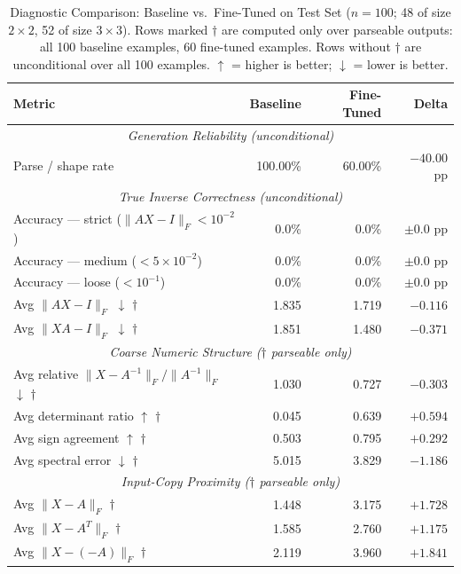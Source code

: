 \begin{table}[h!]
\centering
\caption{Diagnostic Comparison: Baseline vs.\ Fine-Tuned on Test Set ($n = 100$; 48 of size $2 \times 2$, 52 of size $3 \times 3$). Rows marked $\dagger$ are computed only over parseable outputs: all 100 baseline examples, 60 fine-tuned examples. Rows without $\dagger$ are unconditional over all 100 examples. $\uparrow$ = higher is better; $\downarrow$ = lower is better.}
\label{tab:results}
\begin{tabular}{lrrr}
\toprule
\textbf{Metric} & \textbf{Baseline} & \textbf{Fine-Tuned} & \textbf{Delta} \\
\midrule
\multicolumn{4}{c}{\textit{Generation Reliability (unconditional)}} \\
Parse / shape rate & 100.00\% & 60.00\% & $-40.00$ pp \\
\midrule
\multicolumn{4}{c}{\textit{True Inverse Correctness (unconditional)}} \\
Accuracy --- strict ($\|AX-I\|_F < 10^{-2}$) & 0.0\% & 0.0\% & $\pm 0.0$ pp \\
Accuracy --- medium ($< 5 \times 10^{-2}$) & 0.0\% & 0.0\% & $\pm 0.0$ pp \\
Accuracy --- loose ($< 10^{-1}$) & 0.0\% & 0.0\% & $\pm 0.0$ pp \\
Avg $\|AX - I\|_F$ $\downarrow$ $\dagger$ & 1.835 & 1.719 & $-0.116$ \\
Avg $\|XA - I\|_F$ $\downarrow$ $\dagger$ & 1.851 & 1.480 & $-0.371$ \\
\midrule
\multicolumn{4}{c}{\textit{Coarse Numeric Structure ($\dagger$ parseable only)}} \\
Avg relative $\|X - A^{-1}\|_F / \|A^{-1}\|_F$ $\downarrow$ $\dagger$ & 1.030 & 0.727 & $-0.303$ \\
Avg determinant ratio $\uparrow$ $\dagger$ & 0.045 & 0.639 & $+0.594$ \\
Avg sign agreement $\uparrow$ $\dagger$ & 0.503 & 0.795 & $+0.292$ \\
Avg spectral error $\downarrow$ $\dagger$ & 5.015 & 3.829 & $-1.186$ \\
\midrule
\multicolumn{4}{c}{\textit{Input-Copy Proximity ($\dagger$ parseable only)}} \\
Avg $\|X - A\|_F$ $\dagger$ & 1.448 & 3.175 & $+1.728$ \\
Avg $\|X - A^T\|_F$ $\dagger$ & 1.585 & 2.760 & $+1.175$ \\
Avg $\|X - (-A)\|_F$ $\dagger$ & 2.119 & 3.960 & $+1.841$ \\
\bottomrule
\end{tabular}
\end{table}

